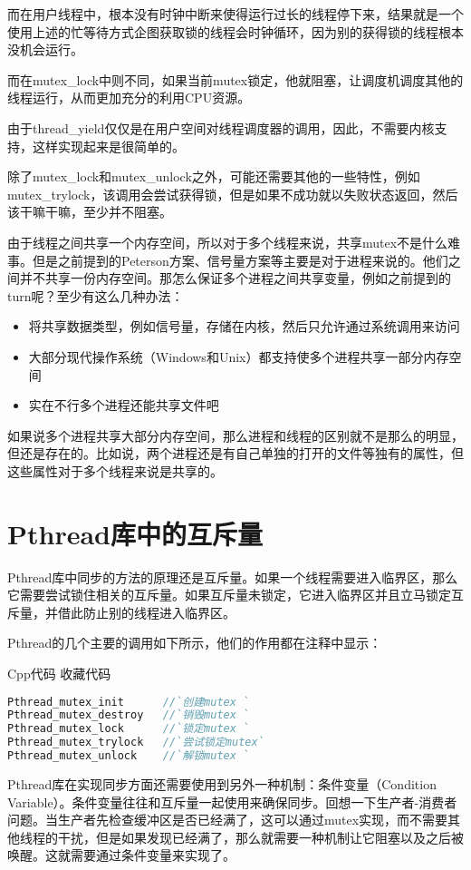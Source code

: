 \documentclass{article}
\begin{document}
\begin{CJK}{UTF8}{gbsn}
    而在用户线程中，根本没有时钟中断来使得运行过长的线程停下来，结果就是一个使用上述的忙等待方式企图获取锁的线程会时钟循环，因为别的获得锁的线程根本没机会运行。

    而在mutex\_lock中则不同，如果当前mutex锁定，他就阻塞，让调度机调度其他的线程运行，从而更加充分的利用CPU资源。

    由于thread\_yield仅仅是在用户空间对线程调度器的调用，因此，不需要内核支持，这样实现起来是很简单的。

    除了mutex\_lock和mutex\_unlock之外，可能还需要其他的一些特性，例如mutex\_trylock，该调用会尝试获得锁，但是如果不成功就以失败状态返回，然后该干嘛干嘛，至少并不阻塞。

    由于线程之间共享一个内存空间，所以对于多个线程来说，共享mutex不是什么难事。但是之前提到的Peterson方案、信号量方案等主要是对于进程来说的。他们之间并不共享一份内存空间。那怎么保证多个进程之间共享变量，例如之前提到的turn呢？至少有这么几种办法：
\begin{itemize}
\itemsep=-3pt
\item 将共享数据类型，例如信号量，存储在内核，然后只允许通过系统调用来访问
\item 大部分现代操作系统（Windows和Unix）都支持使多个进程共享一部分内存空间
\item 实在不行多个进程还能共享文件吧
\end{itemize} 
    如果说多个进程共享大部分内存空间，那么进程和线程的区别就不是那么的明显，但还是存在的。比如说，两个进程还是有自己单独的打开的文件等独有的属性，但这些属性对于多个线程来说是共享的。


\section{Pthread库中的互斥量}
Pthread库中同步的方法的原理还是互斥量。如果一个线程需要进入临界区，那么它需要尝试锁住相关的互斥量。如果互斥量未锁定，它进入临界区并且立马锁定互斥量，并借此防止别的线程进入临界区。

    Pthread的几个主要的调用如下所示，他们的作用都在注释中显示：
 
Cpp代码  收藏代码
\begin{lstlisting}[language=c++]
Pthread_mutex_init      //`创建mutex ` 
Pthread_mutex_destroy   //`销毁mutex ` 
Pthread_mutex_lock      //`锁定mutex ` 
Pthread_mutex_trylock   //`尝试锁定mutex`  
Pthread_mutex_unlock    //`解锁mutex ` 
\end{lstlisting}
    Pthread库在实现同步方面还需要使用到另外一种机制：条件变量（Condition Variable）。条件变量往往和互斥量一起使用来确保同步。回想一下生产者-消费者问题。当生产者先检查缓冲区是否已经满了，这可以通过mutex实现，而不需要其他线程的干扰，但是如果发现已经满了，那么就需要一种机制让它阻塞以及之后被唤醒。这就需要通过条件变量来实现了。
 

\end{CJK}
\end{document}
